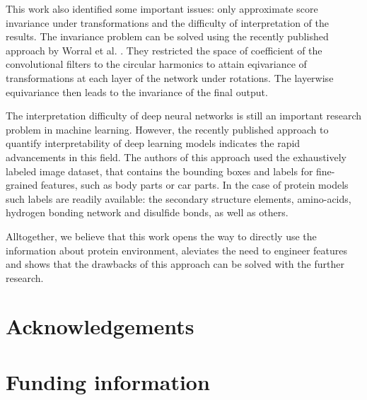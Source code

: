 \documentclass{bioinfo}
\begin{document}
This work also identified some important issues: only approximate score invariance under transformations and the difficulty of 
interpretation of the results. The invariance problem can be solved using the recently published approach by Worral et al. \citep{worrall2016harmonic}.
They restricted the space of coefficient of the convolutional filters to the circular harmonics to attain eqivariance of transformations at each layer 
of the network under rotations. The layerwise equivariance then leads to the invariance of the final output.

The interpretation difficulty of deep neural networks is still an important research problem in machine learning. However, the recently 
published approach to quantify interpretability \citep{bau2017network} of deep learning models indicates the rapid advancements in this field. 
The authors of this approach used the exhaustively labeled image dataset, that contains the bounding boxes and labels for 
fine-grained features, such as body parts or car parts. In the case of protein models such labels are readily available: 
the secondary structure elements, amino-acids, hydrogen bonding network and disulfide bonds, as well as others.

Alltogether, we believe that this work opens the way to directly use the information about protein environment, aleviates the need to 
engineer features and shows that the drawbacks of this approach can be solved with the further research. 

\section{Acknowledgements}
\section{Funding information}



\end{document}
